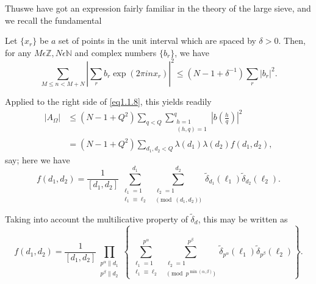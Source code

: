 Thus\pageoriginale we have got an expression fairly familiar in the theory of the
large sieve, and we recall the fundamental 

\begin{Lemma}\label{part1-chap1:sec1.1:lem1}%
  Let $\{x_r \}$ be $a$ set of points in the unit interval
  which are spaced by $\delta > 0$. Then, for any $M \epsilon
  \mathbb{Z}, N \epsilon \mathbb{N}$ and complex numbers
  $\{b_{r }\}$, we have 
  $$
  \sum_{M \leq n < M + N} | \sum_{r } b_{r } \exp (2 \pi i n
  x_{r }) |^{2} \leq (N -1+ \delta^{-1}) \sum _{r } | b_{r }
  |^{2}. 
  $$
\end{Lemma}

Applied to the right side of \eqref{eq1.1.8}, this yields readily
\begin{equation*}
\begin{split}
  | A_{\Omega}| &\leq (N -1+Q^2) \sum_{q < Q}
  \sum_{\substack{h=1\\ (h,q)=1}}^q | b\left(\frac{h}{q}\right) |^{2}\\ 
  & = (N -1+Q^{2}) \sum_{d_1, d_2 < Q} \lambda (d_1) \lambda (d_2)
  f(d_1, d_2),
\end{split}
\tag{1.1.9} \label{eq1.1.9} 
\end{equation*}
say; here we have
$$
f(d_1, d_2) = \frac{1}{[d_1, d_2]} \sum_{\substack{\ell_1 = 1\\ \ell_1
    \equiv \ell_2}}^{d_1} 
\sum_{\substack{\ell_2 =1\\ \pmod{(d_1, d_2)}}}^{d_2}
\tilde{\delta}_{d_{1}} (\ell_1) \tilde{\delta}_{d_{2}} (\ell_2). 
$$

Taking into account the multilicative property of $\tilde{\delta}_d$,
this may be written as 
$$
f(d_1, d_2) = \frac{1}{[d_1, d_2]} \prod_{\substack{p ^{\alpha} \|
    d_1 \\ p^{\beta} \| d_2}} \left\{ \sum^{p^\alpha}_{\substack{\ell_1 = 1 \\ \ell _1
    \equiv \ell_2}} \sum^{p^\beta}_{\substack{\ell _2 = 1 \\ \pmod{p^{\min
      (\alpha, \beta)}}}} \tilde{\delta}_{p^{\alpha}} (\ell _1)
 \tilde{\delta}_{p^{\beta}} (\ell_2)\right\}. 
$$

